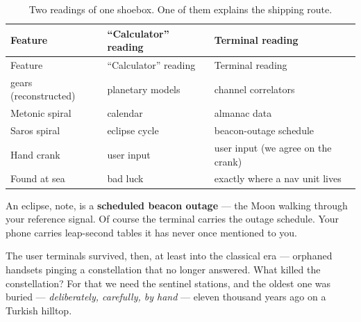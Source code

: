 \documentclass[
  english,
  11pt,
  letterpaper,
]{scrbook}
\begin{document}
\begin{longtable}[]{@{}
  >{\raggedright\arraybackslash}p{}
  >{\raggedright\arraybackslash}p{}
  >{\raggedright\arraybackslash}p{}@{}}
\caption{Two readings of one shoebox. One of them explains the shipping
route.}\label{tbl-antikythera}\tabularnewline
\toprule\noalign{}
\begin{minipage}[b]{\linewidth}\raggedright
Feature
\end{minipage} & \begin{minipage}[b]{\linewidth}\raggedright
``Calculator'' reading
\end{minipage} & \begin{minipage}[b]{\linewidth}\raggedright
Terminal reading
\end{minipage} \\
\midrule\noalign{}
\endfirsthead
\toprule\noalign{}
\begin{minipage}[b]{\linewidth}\raggedright
Feature
\end{minipage} & \begin{minipage}[b]{\linewidth}\raggedright
``Calculator'' reading
\end{minipage} & \begin{minipage}[b]{\linewidth}\raggedright
Terminal reading
\end{minipage} \\
\midrule\noalign{}
\endhead
\bottomrule\noalign{}
\endlastfoot
37 gears (reconstructed) & planetary models & channel correlators \\
Metonic spiral & calendar & almanac data \\
Saros spiral & eclipse cycle & beacon-outage schedule \\
Hand crank & user input & user input (we agree on the crank) \\
Found at sea & bad luck & exactly where a nav unit lives \\
\end{longtable}

An eclipse, note, is a \textbf{scheduled beacon outage} --- the Moon
walking through your reference signal. Of course the terminal carries
the outage schedule. Your phone carries leap-second tables it has never
once mentioned to you.

The user terminals survived, then, at least into the classical era ---
orphaned handsets pinging a constellation that no longer answered. What
killed the constellation? For that we need the sentinel stations, and
the oldest one was buried --- \emph{deliberately, carefully, by hand}
--- eleven thousand years ago on a Turkish hilltop.
\end{document}
